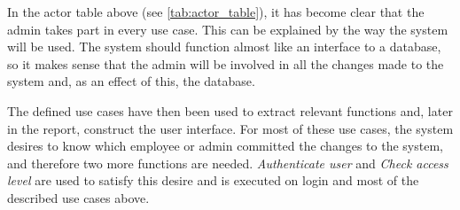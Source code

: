 In the actor table above (see \autoref{tab:actor_table}), it has become clear that the admin takes part in every use case. This can be explained by the way the system will be used. The system should function almost like an interface to a database, so it makes sense that the admin will be involved in all the changes made to the system and, as an effect of this, the database.

\par
The defined use cases have then been used to extract relevant functions and, later in the report, construct the user interface. For most of these use cases, the system desires to know which employee or admin committed the changes to the system, and therefore two more functions are needed. \textit{Authenticate user} and \textit{Check access level} are used to satisfy this desire and is executed on login and most of the described use cases above.